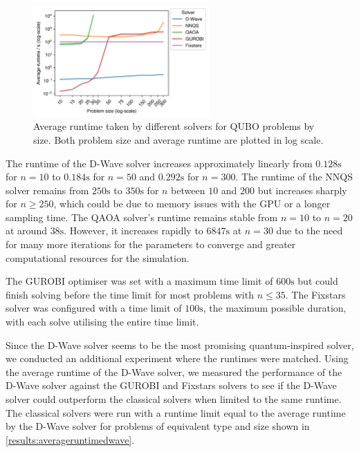\begin{figure}[!htb]
    \centering
    \includegraphics[width=0.6\textwidth]{images/all_time_average.png}
    \caption{Average runtime taken by different solvers for QUBO problems by size. Both problem size and average runtime are plotted in log scale.}
    \label{results:timeaverage}
\end{figure}

The runtime of the D-Wave solver increases approximately linearly from $0.128\si{\second}$ for $n=10$ to $0.184\si{\second}$ for $n=50$ and $0.292\si{\second}$ for $n=300$. The runtime of the NNQS solver remains from $250\si{\second}$ to $350\si{\second}$ for $n$ between $10$ and $200$ but increases sharply for $n \geq 250$, which could be due to memory issues with the GPU or a longer sampling time. The QAOA solver's runtime remains stable from $n=10$ to $n=20$ at around $38 \si{\second}$. However, it increases rapidly to $6847 \si{\second}$ at $n=30$ due to the need for many more iterations for the parameters to converge and greater computational resources for the simulation.

The GUROBI optimiser was set with a maximum time limit of $600 \si{\second}$ but could finish solving before the time limit for most problems with $n \leq 35$. The Fixstars solver was configured with a time limit of $100 \si{\second}$, the maximum possible duration, with each solve utilising the entire time limit.

Since the D-Wave solver seems to be the most promising quantum-inspired solver, we conducted an additional experiment where the runtimes were matched. Using the average runtime of the D-Wave solver, we measured the performance of the D-Wave solver against the GUROBI and Fixstars solvers to see if the D-Wave solver could outperform the classical solvers when limited to the same runtime. The classical solvers were run with a runtime limit equal to the average runtime by the D-Wave solver for problems of equivalent type and size shown in \autoref{results:averageruntimedwave}.

